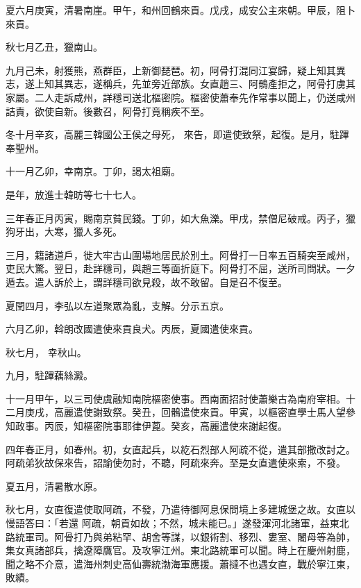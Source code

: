 \begin{pinyinscope}
 夏六月庚寅，清暑南崖。甲午，和州回鶴來貢。戊戌，成安公主來朝。甲辰，阻卜來貢。



 秋七月乙丑，獵南山。



 九月己未，射獲熊，燕群臣，上新御琵琶。初，阿骨打混同江宴歸，疑上知其異志，遂上知其異志，遂稱兵，先並旁近部族。女直趙三、阿鶻產拒之，阿骨打虜其家屬。二人走訴咸州，詳穩司送北樞密院。樞密使蕭奉先作常事以聞上，仍送咸州詰責，欲使自新。後數召，阿骨打竟稱疾不至。



 冬十月辛亥，高麗三韓國公王侯之母死，
 來告，即遣使致祭，起復。是月，駐蹕奉聖州。



 十一月乙卯，幸南京。丁卯，謁太祖廟。



 是年，放進士韓昉等七十七人。



 三年春正月丙寅，賜南京貧民錢。丁卯，如大魚濼。甲戌，禁僧尼破戒。丙子，獵狗牙出，大寒，獵人多死。



 三月，籍諸道戶，徙大牢古山圍場地居民於別土。阿骨打一日率五百騎突至咸州，吏民大驚。翌日，赴詳穩司，與趙三等面折庭下。阿骨打不屈，送所司問狀。一夕遁去。遣人訴於上，謂詳穩司欲見殺，故不敢留。自是召不復至。



 夏閏四月，李弘以左道聚眾為亂，支解。分示五京。



 六月乙卯，斡朗改國遣使來貢良犬。丙辰，夏國遣使來貢。



 秋七月，
 幸秋山。



 九月，駐蹕藕絲澱。



 十一月甲午，以三司使虞融知南院樞密使事。西南面招討使蕭樂古為南府宰相。十二月庚戌，高麗遣使謝致祭。癸丑，回鶻遣使來貢。甲寅，以樞密直學士馬人望參知政事。丙辰，知樞密院事耶律伊蓖。癸亥，高麗遣使來謝起復。



 四年春正月，如春州。初，女直起兵，以紇石烈部人阿疏不從，遣其部撒改討之。阿疏弟狄故保來告，詔諭使勿討，不聽，阿疏來奔。至是女直遣使來索，不發。



 夏五月，清暑散水原。



 秋七月，女直復遣使取阿疏，不發，乃遣待御阿息保問境上多建城堡之故。女直以慢語答曰：「若還
 阿疏，朝貢如故；不然，城未能已。」遂發渾河北諸軍，益東北路統軍司。阿骨打乃與弟粘罕、胡舍等謀，以銀術割、移烈、婁室、闍母等為帥，集女真諸部兵，擒遼障鷹官。及攻寧江州。東北路統軍可以聞。時上在慶州射鹿，聞之略不介意，遣海州刺史高仙壽統渤海軍應援。蕭撻不也遇女直，戰於寧江東，敗績。




\end{pinyinscope}
